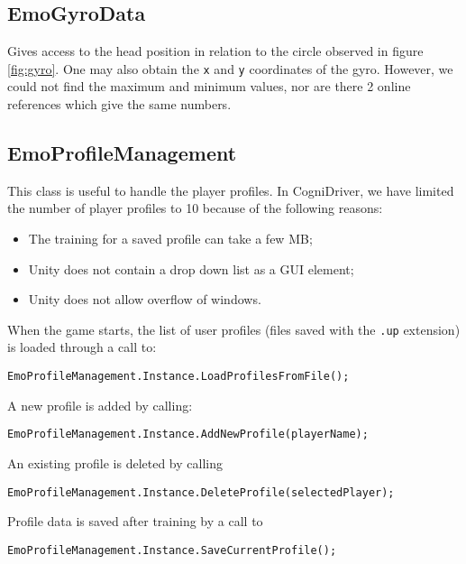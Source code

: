 \subsection{EmoGyroData}
Gives access to the head position in relation to the circle observed in figure \ref{fig:gyro}. One may also obtain the \texttt{x} and \texttt{y} coordinates of the gyro. However, we could not find the maximum and minimum values, nor are there 2 online references which give the same numbers.

\subsection{EmoProfileManagement}
This class is useful to handle the player profiles. In CogniDriver, we have limited the number of player profiles to 10 because of the following reasons:
\begin{itemize}
	\item The training for a saved profile can take a few MB;
	\item Unity does not contain a drop down list as a GUI element;
	\item Unity does not allow overflow of windows.
\end{itemize}

When the game starts, the list of user profiles (files saved with the \texttt{.up} extension) is loaded through a call to:

\begin{Verbatim}[frame=single, framesep=3mm]
EmoProfileManagement.Instance.LoadProfilesFromFile();
\end{Verbatim}

A new profile is added by calling:

\begin{Verbatim}[frame=single, framesep=3mm]
EmoProfileManagement.Instance.AddNewProfile(playerName);
\end{Verbatim}

An existing profile is deleted by calling

\begin{Verbatim}[frame=single, framesep=3mm]
EmoProfileManagement.Instance.DeleteProfile(selectedPlayer);
\end{Verbatim}

Profile data is saved after training by a call to 

\begin{Verbatim}[frame=single, framesep=3mm]
EmoProfileManagement.Instance.SaveCurrentProfile();
\end{Verbatim}


